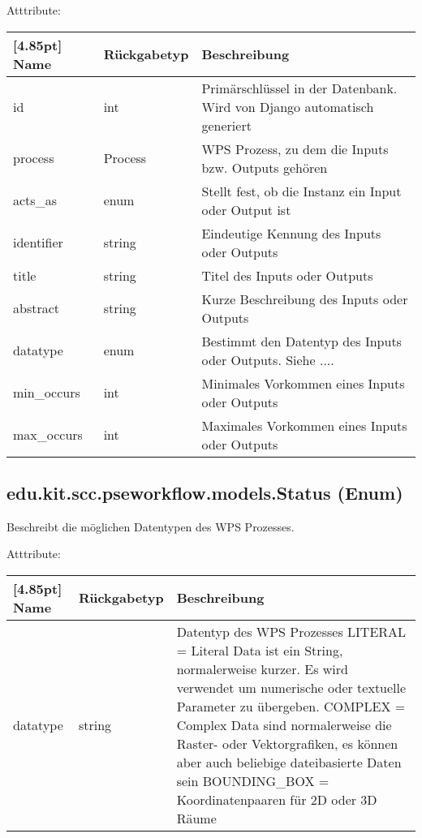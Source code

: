 			Atttribute:
			\begin{center}
				\setlength\tabcolsep{5pt}
				\renewcommand{\arraystretch}{1.5}
				
				\begin{tabularx}{\textwidth}{|l|l|X|}
					\hline
					\rowcolor[gray]{0.75}[4.85pt]
					Name & Rückgabetyp & Beschreibung \\ \hline 
					id & int & Primärschlüssel in der Datenbank. Wird von Django automatisch generiert \\ \hline
					process & Process & WPS Prozess, zu dem die Inputs bzw. Outputs gehören \\ \hline
					acts_as & enum & Stellt fest, ob die Instanz ein Input oder Output ist \\ \hline
					identifier & string & Eindeutige Kennung des Inputs oder Outputs \\ \hline
					title & string & Titel des Inputs oder Outputs \\ \hline
					abstract & string & Kurze Beschreibung des Inputs oder Outputs \\ \hline
					datatype & enum & Bestimmt den Datentyp des Inputs oder Outputs. 
					Siehe .... \\ \hline
					min\_occurs & int & Minimales Vorkommen eines Inputs oder Outputs \\ \hline
					max\_occurs & int & Maximales Vorkommen eines Inputs oder Outputs \\ \hline
 					\hline
				\end{tabularx}
			\end{center}
			
        \subsection{edu.kit.scc.pseworkflow.models.Status (Enum)}	
			Beschreibt die möglichen Datentypen des WPS Prozesses. \newline
			
			Atttribute:
			\begin{center}
				\setlength\tabcolsep{5pt}
				\renewcommand{\arraystretch}{1.5}
				
				\begin{tabularx}{\textwidth}{|l|l|X|}
					\hline
					\rowcolor[gray]{0.75}[4.85pt]
					Name & Rückgabetyp & Beschreibung \\ \hline 
	           		datatype & string & Datentyp des WPS Prozesses\newline
	           		LITERAL =  Literal Data ist ein String, normalerweise kurzer. Es wird verwendet um numerische oder textuelle Parameter zu übergeben.   \newline
	           		COMPLEX = Complex Data sind normalerweise die Raster- oder Vektorgrafiken, es können aber auch beliebige dateibasierte Daten sein\newline 
	           		BOUNDING_BOX = Koordinatenpaaren für 2D oder 3D Räume \\ \hline
				\end{tabularx}
			\end{center}

